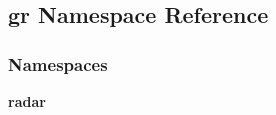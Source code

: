 \subsection{gr Namespace Reference}
\label{namespacegr}
\subsubsection*{Namespaces}
\begin{DoxyCompactItemize}
\item 
 {\bf radar}
\end{DoxyCompactItemize}
